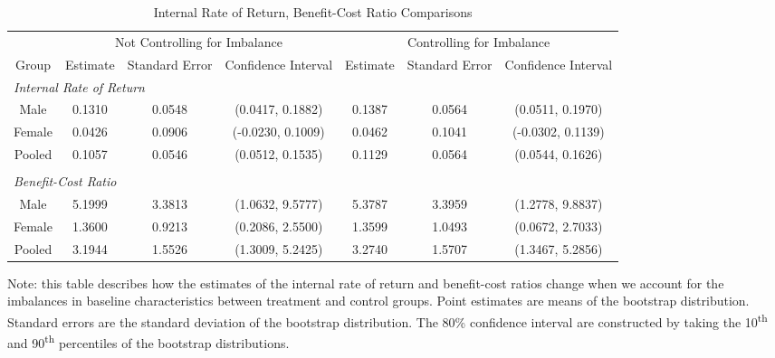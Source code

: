 \begin{table}[H]
\small
\begin{threeparttable}
\caption{Internal Rate of Return, Benefit-Cost Ratio Comparisons}
\label{tab:irrbcr_compare}
\begin{tabular}{cccc|ccc}
\hline\hline
& \multicolumn{3}{c|}{Not Controlling for Imbalance} & \multicolumn{3}{c}{Controlling for Imbalance} \\
Group & Estimate & Standard Error & Confidence Interval & Estimate & Standard Error & Confidence Interval \\
\hline
\multicolumn{4}{l|}{\emph{Internal Rate of Return}}\\
Male & 0.1310 & 0.0548 & (0.0417, 0.1882) & 0.1387 & 0.0564 & (0.0511, 0.1970) \\
Female & 0.0426 & 0.0906 & (-0.0230, 0.1009) & 0.0462 & 0.1041 & (-0.0302, 0.1139) \\
Pooled & 0.1057 & 0.0546 & (0.0512, 0.1535) &  0.1129 & 0.0564 & (0.0544, 0.1626) \\
& & & & & & \\
\multicolumn{4}{l|}{\emph{Benefit-Cost Ratio}}\\
Male & 5.1999 & 3.3813 & (1.0632, 9.5777) & 5.3787 & 3.3959 & (1.2778, 9.8837) \\
Female & 1.3600 & 0.9213 & (0.2086, 2.5500) & 1.3599 & 1.0493 & (0.0672, 2.7033) \\
Pooled & 3.1944 & 1.5526 & (1.3009, 5.2425) & 3.2740 & 1.5707 & (1.3467, 5.2856) \\
\hline\hline
\end{tabular}
\begin{tablenotes}
\footnotesize
\item Note: this table describes how the estimates of the internal rate of return and
benefit-cost ratios change when we account for the imbalances in baseline characteristics 
between treatment and control groups. Point estimates are means of the bootstrap distribution. 
Standard errors are the standard deviation of the bootstrap distribution. The 80\%
confidence interval are constructed by taking the 10\textsuperscript{th} and 
90\textsuperscript{th} percentiles of the bootstrap distributions. 
\end{tablenotes}
\end{threeparttable}
\end{table}
